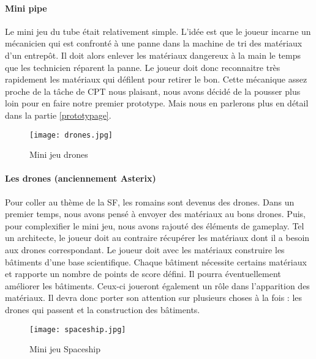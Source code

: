 \paragraph{Mini pipe}Le mini jeu du tube était relativement simple. L'idée est que le joueur incarne un mécanicien qui est confronté à une panne dans la machine de tri des matériaux d'un
entrepôt. Il doit alors enlever les matériaux dangereux à la main le temps que les technicien réparent la panne. Le joueur doit donc reconnaitre très rapidement les matériaux qui
défilent pour retirer le bon. Cette mécanique assez proche de la tâche de CPT nous plaisant, nous avons décidé de la pousser plus loin pour en faire notre premier prototype. Mais nous
en parlerons plus en détail dans la partie \ref{prototypage}.

\begin{wrapfigure}[11]{l}{6cm}
    \vspace{-25pt}
    \begin{center}
    \texttt{[image: drones.jpg]}
    \end{center}
    \captionsetup{labelformat=simpleNumber}
    \caption{Mini jeu drones}
\label{Drones}
\end{wrapfigure}

\paragraph{Les drones (anciennement Asterix)} Pour coller au thème de la \gls{SF}, les romains sont devenus des drones. Dans un premier temps, nous avons pensé à envoyer des matériaux
au bons drones. Puis, pour complexifier le mini jeu, nous avons rajouté des éléments de gameplay. Tel un architecte, le joueur doit au contraire récupérer les matériaux dont
il a besoin aux drones correspondant. Le joueur doit avec les matériaux construire les bâtiments d'une base scientifique. Chaque bâtiment nécessite certains matériaux et rapporte un
nombre de points de score défini. Il pourra éventuellement améliorer les bâtiments. Ceux-ci joueront également un rôle dans l'apparition des matériaux. Il devra donc porter son
attention sur plusieurs choses à la fois : les drones qui passent et la construction des bâtiments.

\begin{wrapfigure}[17]{l}{6cm}
    \vspace{-10pt}
    \begin{center}
    \texttt{[image: spaceship.jpg]}
    \end{center}
    \captionsetup{labelformat=simpleNumber}
    \caption{Mini jeu Spaceship}
\label{Spaceship}
\end{wrapfigure}

